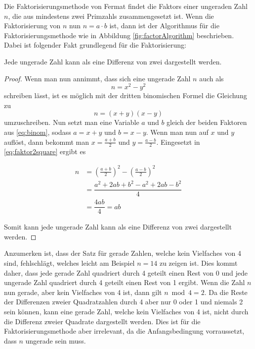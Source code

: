 Die Faktorisierungsmethode von Fermat findet die \Glspl{Faktor} einer  ungeraden Zahl $n$, die aus mindestens zwei \Glspl{Primzahl} zusammengesetzt ist. Wenn die Faktorisierung von $n$ nun $n = a \cdot b$ ist, dann ist der Algorithmus für die Faktorisierungsmethode wie in Abbildung \ref{fig:factorAlgorithm} beschrieben. Dabei ist folgender Fakt grundlegend für die Faktorisierung:

\begin{theorem}
    Jede ungerade Zahl kann als eine Differenz von zwei  dargestellt werden.
\end{theorem}
\begin{proof}
    Wenn man nun annimmt, dass sich eine ungerade Zahl $n$ auch als \begin{equation} \label{eq:faktor2square}
        n = x^2 - y^2
    \end{equation}
    schreiben lässt, ist es möglich mit der dritten binomischen Formel die Gleichung zu
    \begin{equation} \label{eq:binom}
        n = (x+y)(x-y)
    \end{equation}
    umzuschreiben. Nun setzt man eine Variable $a$ und $b$ gleich der beiden Faktoren aus \eqref{eq:binom}, sodass $a = x + y$ und $b = x - y$. Wenn man nun auf $x$ und $y$ auflöst, dann bekommt man $x = \frac{a+b}{2}$ und $y = \frac{a-b}{2}$. Eingesetzt in \eqref{eq:faktor2square} ergibt es

    \begin{align*}
        n & = \left( \frac{a+b}{2} \right)^2 - \left( \frac{a-b}{2} \right)^2 \\
          & = \dfrac{a^2 + 2ab + b^2 - a^2 + 2ab - b^2}{4}                    \\
          & = \dfrac{4ab}{4} = ab
    \end{align*}

    Somit kann jede ungerade Zahl kann als eine Differenz von zwei  dargestellt werden.

\end{proof}

Anzumerken ist, dass der Satz für gerade Zahlen, welche kein Vielfaches von 4 sind, fehlschlägt, welches leicht am Beispiel $n = 14$ zu zeigen ist. Dies kommt daher, dass jede gerade Zahl quadriert durch 4 geteilt einen Rest von 0 und jede ungerade Zahl quadriert durch 4 geteilt einen Rest von 1 ergibt. Wenn die Zahl $n$ nun gerade, aber kein Vielfaches von 4 ist, dann gilt $n \bmod 4 = 2$. Da die Reste der Differenzen zweier Quadratzahlen durch 4 aber nur 0 oder 1 und niemals 2 sein können, kann eine gerade Zahl, welche kein Vielfaches von 4 ist, nicht durch die Differenz zweier Quadrate dargestellt werden. Dies ist für die Faktorisierungsmethode aber irrelevant, da die Anfangsbedingung vorraussetzt, dass $n$ ungerade sein muss.

